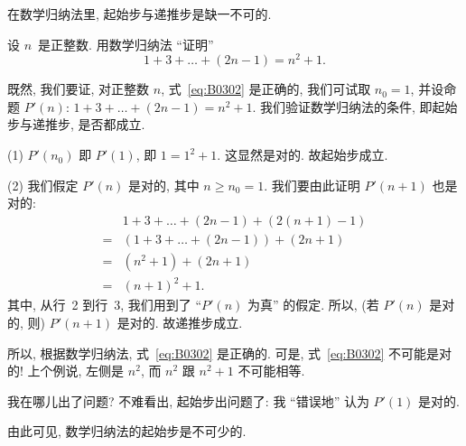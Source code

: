 \vspace{2ex}

在数学归纳法里, 起始步与递推步是缺一不可的.

\begin{example}[缺起始步]
    设 \(n\)~是正整数.
    用数学归纳法 ``证明''
    \begin{equation}
        1 + 3 + \dots + (2n - 1) = n^2 + 1.
        \label{eq:B0302}
    \end{equation}

    既然, 我们要证, 对正整数 \(n\),
    式~\eqref{eq:B0302} 是正确的,
    我们可试取 \(n_0 = 1\),
    并设命题 \(P'(n)\): \(1 + 3 + \dots + (2n - 1) = n^2 + 1\).
    我们验证数学归纳法的条件,
    即起始步与递推步,
    是否都成立.

    (1)
    \(P'(n_0)\) 即 \(P'(1)\), 即 \(1 = 1^2 + 1\).
    这显然是对的.
    故起始步成立.

    (2)
    我们假定 \(P'(n)\) 是对的, 其中 \(n \geq n_0 = 1\).
    我们要由此证明 \(P'(n+1)\) 也是对的:
    \begin{align*}
             & 1 + 3 + \dots + (2n - 1) + (2(n+1) - 1)
        \\
        = {} & (1 + 3 + \dots + (2n - 1)) + (2n + 1)
        \\
        = {} & (n^2 + 1) + (2n + 1)
        \\
        = {} & (n + 1)^2 + 1.
    \end{align*}
    其中, 从行~2 到行~3,
    我们用到了 ``\(P'(n)\) 为真'' 的假定.
    所以, (若 \(P'(n)\) 是对的, 则) \(P'(n+1)\) 是对的.
    故递推步成立.

    所以, 根据数学归纳法,
    式~\eqref{eq:B0302} 是正确的.
    可是, 式~\eqref{eq:B0302} 不可能是对的!
    上个例说, 左侧是 \(n^2\),
    而 \(n^2\) 跟 \(n^2 + 1\) 不可能相等.

    我在哪儿出了问题?
    不难看出, 起始步出问题了:
    我 ``错误地'' 认为 \(P'(1)\) 是对的.

    由此可见, 数学归纳法的起始步是不可少的.
\end{example}

